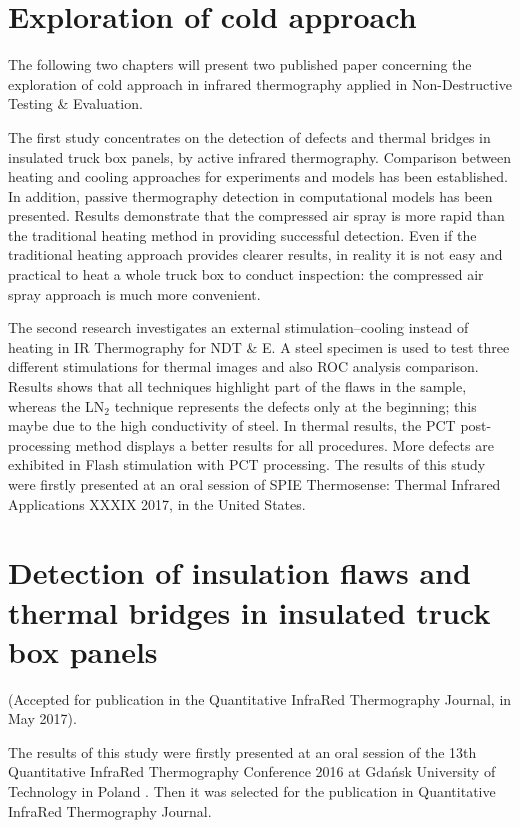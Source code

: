 \chapter*{Exploration of cold approach}     %
The following two chapters will present two published paper concerning the exploration of cold approach in infrared thermography applied in Non-Destructive Testing \& Evaluation.

The first study concentrates on the detection of defects and thermal bridges in insulated truck box panels, by active infrared thermography. Comparison between heating and cooling approaches for experiments and models has been established. In addition, passive thermography detection in computational models has been presented. Results demonstrate that the compressed air spray is more rapid than the traditional heating method in providing successful detection. Even if the traditional heating approach provides clearer results, in reality it is not easy and practical to heat a whole truck box to conduct inspection: the compressed air spray approach is much more convenient.

The second research investigates an external stimulation–cooling instead of heating in IR Thermography for NDT \& E. A steel specimen is used to test three different stimulations for thermal images and also ROC analysis comparison. Results shows that all techniques highlight part of the flaws in the sample, whereas the LN$_2$ technique represents the defects only at the beginning; this maybe due to the high conductivity of steel. In thermal results, the PCT post-processing method displays a better results for all procedures. More defects are exhibited in Flash stimulation with PCT processing.  The results of this study were firstly presented at an oral session of SPIE Thermosense: Thermal Infrared Applications XXXIX 2017, in the United States.

\chapter{Detection of insulation flaws and thermal bridges in insulated truck box panels}
(Accepted for publication in the Quantitative InfraRed Thermography Journal, in May 2017).

%
The results of this study were firstly presented at an oral session of the 13th Quantitative InfraRed Thermography Conference 2016 at Gdańsk University of Technology in Poland . Then it was selected for the publication in Quantitative InfraRed Thermography Journal.


